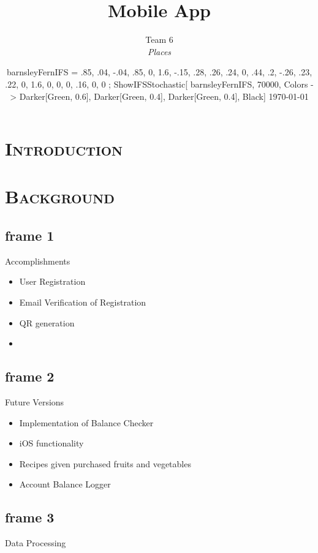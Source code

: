 \documentclass[xcolor=x11names,compress]{beamer}
\renewcommand{\(}{\begin{columns}}
\renewcommand{\)}{\end{columns}}
\newcommand{\<}[1]{\begin{column}{#1}}
\renewcommand{\>}{\end{column}}
\begin{document}
\section{\scshape Introduction}
\begin{frame}
\title{Mobile App}
\author{
	Team 6\\
	{\it Places}\\
}
\date{
	 barnsleyFernIFS = {
  {{{.85, .04}, {-.04, .85}}, {0, 1.6}},
  {{{-.15, .28}, {.26, .24}}, {0, .44}},
  {{{.2, -.26}, {.23, .22}}, {0, 1.6}},
  {{{0, 0}, {0, .16}}, {0, 0}}
};
ShowIFSStochastic[
  barnsleyFernIFS, 70000,
  Colors -> {Darker[Green, 0.6], Darker[Green, 0.4],
    Darker[Green, 0.4], Black}]
	\vspace{1cm}
	\today
}
\titlepage
\end{frame}


\section{\scshape Background}
\subsection{frame 1}
\begin{frame}{Accomplishments}
\begin{itemize}
\item User Registration 
\item Email Verification of Registration
\item QR generation
\item 
\end{itemize}
\end{frame}

\subsection{frame 2}
\begin{frame}{Future Versions}
\begin{itemize}
\item Implementation of Balance Checker
\item iOS functionality
\item Recipes given purchased fruits and vegetables
\item Account Balance Logger
\end{itemize}
\end{frame}

\subsection{frame 3}
\begin{frame}{Data Processing}

\end{frame}
\end{document}
